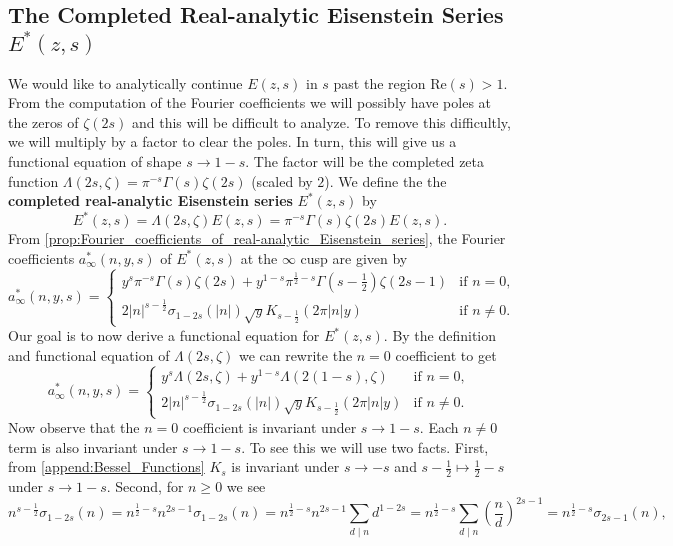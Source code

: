 \documentclass[12pt]{book}
\theoremstyle{definition}\newframedtheorem{method}{Method}
\newcommand{\z}{\zeta}
\newcommand{\s}{\sigma}
\newcommand{\G}{\Gamma}
\renewcommand{\L}{\Lambda}
\newcommand{\<}{\langle}
\renewcommand{\>}{\rangle}
\renewcommand{\Re}{\mathrm{Re}}
\begin{document}
    \subsection*{The Completed Real-analytic Eisenstein Series \texorpdfstring{$E^{\ast}(z,s)$}{E*(z,s)}}
      We would like to analytically continue $E(z,s)$ in $s$ past the region $\Re(s) > 1$. From the computation of the Fourier coefficients we will possibly have poles at the zeros of $\z(2s)$ and this will be difficult to analyze. To remove this difficultly, we will multiply by a factor to clear the poles. In turn, this will give us a functional equation of shape $s \to 1-s$. The factor will be the completed zeta function $\L(2s,\z) = \pi^{-s}\G(s)\z(2s)$ (scaled by $2$). We define the the \textbf{completed real-analytic Eisenstein series} $E^{\ast}(z,s)$ by
      \[
        E^{\ast}(z,s) = \L(2s,\z)E(z,s) = \pi^{-s}\G(s)\z(2s)E(z,s).
      \]
      From \cref{prop:Fourier_coefficients_of_real-analytic_Eisenstein_series}, the Fourier coefficients $a_{\infty}^{\ast}(n,y,s)$ of $E^{\ast}(z,s)$ at the $\infty$ cusp are given by
      \[
        a_{\infty}^{\ast}(n,y,s) = \begin{cases} y^{s}\pi^{-s}\G(s)\z(2s)+y^{1-s}\pi^{\frac{1}{2}-s}\G(s-\frac{1}{2})\z(2s-1) & \text{if $n = 0$}, \\ 2|n|^{s-\frac{1}{2}}\s_{1-2s}(|n|)\sqrt{y}K_{s-\frac{1}{2}}(2\pi|n|y) & \text{if $n \neq 0$}. \end{cases}
      \]
      Our goal is to now derive a functional equation for $E^{\ast}(z,s)$. By the definition and functional equation of $\L(2s,\z)$ we can rewrite the $n = 0$ coefficient to get
      \[
        a_{\infty}^{\ast}(n,y,s) = \begin{cases} y^{s}\L(2s,\z)+y^{1-s}\L(2(1-s),\z) & \text{if $n = 0$}, \\ 2|n|^{s-\frac{1}{2}}\s_{1-2s}(|n|)\sqrt{y}K_{s-\frac{1}{2}}(2\pi|n|y) & \text{if $n \neq 0$}. \end{cases}
      \]
      Now observe that the $n = 0$ coefficient is invariant under $s \to 1-s$. Each $n \neq 0$ term is also invariant under $s \to 1-s$. To see this we will use two facts. First, from \cref{append:Bessel_Functions} $K_{s}$ is invariant under $s \to -s$ and $s-\frac{1}{2} \mapsto \frac{1}{2}-s$ under $s \to 1-s$. Second, for $n \ge 0$ we see
      \[
        n^{s-\frac{1}{2}}\s_{1-2s}(n) = n^{\frac{1}{2}-s}n^{2s-1}\s_{1-2s}(n) = n^{\frac{1}{2}-s}n^{2s-1}\sum_{d \mid n}d^{1-2s} = n^{\frac{1}{2}-s}\sum_{d \mid n}\left(\frac{n}{d}\right)^{2s-1} = n^{\frac{1}{2}-s}\s_{2s-1}(n),
      \]
\end{document}
